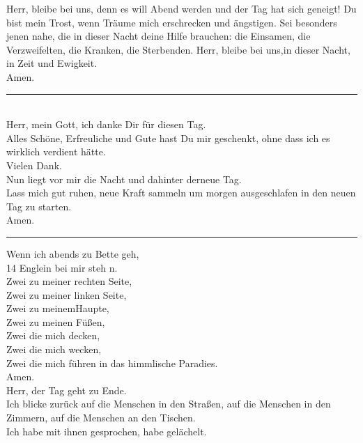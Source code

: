 Herr, bleibe bei uns, denn es will Abend werden und der Tag hat sich geneigt! Du bist mein Trost, wenn Träume mich erschrecken und ängstigen.  Sei besonders jenen nahe, die in dieser Nacht deine Hilfe brauchen: die Einsamen, die Verzweifelten, die Kranken, die Sterbenden.  Herr, bleibe bei uns,in dieser Nacht, in Zeit und Ewigkeit. \\ \newline
Amen.\\
\par\noindent\rule{\textwidth}{0.4pt} \newline \newline
\\
Herr, mein Gott, ich danke Dir für diesen Tag.\\ 
Alles Schöne, Erfreuliche und Gute hast Du mir geschenkt, ohne dass ich es wirklich verdient hätte.\\
Vielen Dank.\\
Nun liegt vor mir die Nacht und dahinter derneue Tag.\\
Lass mich gut ruhen, neue Kraft sammeln um morgen ausgeschlafen in den neuen Tag zu starten.\\ \newline
Amen.\\
\par\noindent\rule{\textwidth}{0.4pt} \newline \newline
Wenn ich abends zu Bette geh,\\
14 Englein bei mir steh n.\\
Zwei zu meiner rechten Seite,\\
Zwei zu meiner linken Seite,  \\
Zwei zu meinemHaupte, \\
Zwei zu meinen Füßen,\\
Zwei die mich decken,\\
Zwei die mich wecken,\\
Zwei die mich führen in das himmlische Paradies.\\ \newline
Amen.\\
\newpage
Herr, der Tag geht zu Ende.\\
Ich blicke zurück auf die Menschen in den Straßen, auf die Menschen in den\\
Zimmern, auf die Menschen an den Tischen.\\
Ich habe mit ihnen gesprochen, habe gelächelt.\\
